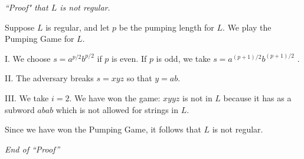 \documentclass[11pt]{article}
\begin{document}
\emph{``Proof" that $L$ is not regular}. 

Suppose $L$ is regular, and let $p$ be the pumping length for $L$. We play the Pumping Game for $L$.
\medskip

I. We choose $s = a^{p/2} b^{p/2}$ if $p$ is even. If $p$ is odd, we take $s = a^{(p+1)/2} b^{(p+1)/2}$ .
\smallskip

II. The adversary breaks $s = xyz$ so that $y=ab$.
\smallskip


III. We take $i=2$. We have won the game: $xyyz$ is not in $L$ because it has as a subword $abab$ which is not allowed for strings in $L$.
 \medskip

Since we have won the Pumping Game, it follows that $L$ is not regular.

\emph{End of ``Proof''}
 
\end{document}
